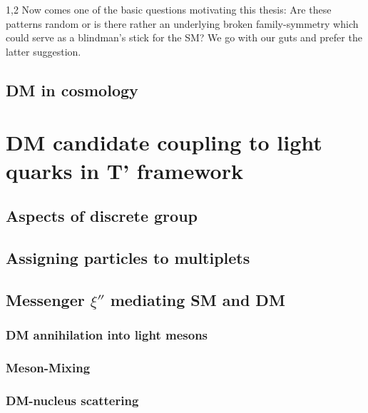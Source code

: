 \documentclass[11pt,a4paper,twoside]{article}
\begin{document}
\begin{spacing}{1,2}
Now comes one of the basic questions motivating this thesis: Are these patterns random or is there rather an underlying broken family-symmetry which
could serve as a blindman's stick for the SM? We go with our guts and prefer the latter suggestion.

\subsection{DM in cosmology}

\section{DM candidate coupling to light quarks in T' framework}
\subsection{Aspects of discrete group}
\subsection{Assigning particles to multiplets}
\subsection{Messenger $\xi''$ mediating SM and DM}
\subsubsection{DM annihilation into light mesons}
\subsubsection{Meson-Mixing}
\subsubsection{DM-nucleus scattering}


\newpage\listoffigures\newpage
{}
\listoftables\newpage
\end{spacing}
\end{document}
